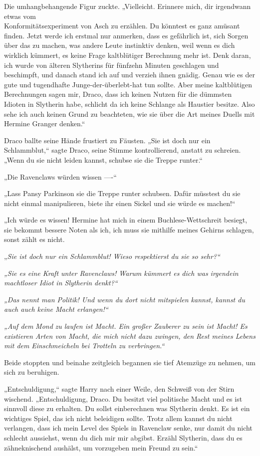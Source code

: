 {Die umhangbehangende Figur zuckte. „Vielleicht. Erinnere mich, dir irgendwann etwas vom\\ Konformitätsexperiment von Asch zu erzählen. Du könntest es ganz amüsant finden. Jetzt werde ich erstmal nur anmerken, dass es gefährlich ist, sich Sorgen über das zu machen, was andere Leute instinktiv denken, weil wenn es dich wirklich kümmert, es keine Frage kaltblütiger Berechnung mehr ist. Denk daran, ich wurde von älteren Slytherins für fünfzehn Minuten geschlagen und beschimpft, und danach stand ich auf und verzieh ihnen gnädig. Genau wie es der gute und tugendhafte Junge-der-überlebt-hat tun sollte. Aber meine kaltblütigen Berechnungen sagen mir, Draco, dass ich keinen Nutzen für die dümmsten Idioten in Slytherin habe, schlicht da ich keine Schlange als Haustier besitze. Also sehe ich auch keinen Grund zu beachteten, wie sie über die Art meines Duells mit Hermine Granger denken.“

Draco ballte seine Hände frustiert zu Fäusten. „Sie ist doch nur ein Schlammblut,“ sagte Draco, seine Stimme kontrollierend, anstatt zu schreien. „Wenn du sie nicht leiden kannst, schubse sie die Treppe runter.“

„Die Ravenclaws würden wissen ----“

„Lass Pansy Parkinson sie die Treppe runter schubsen. Dafür müsstest du sie nicht einmal manipulieren, biete ihr einen Sickel und sie würde es machen!“

„Ich würde es wissen! Hermine hat mich in einem Buchlese-Wettschreit besiegt, sie bekommt bessere Noten als ich, ich muss sie mithilfe meines Gehirns schlagen, sonst zählt es nicht.

„\emph{Sie ist doch nur ein Schlammblut! Wieso respektierst du sie so sehr?“}

\emph{„Sie es eine Kraft unter Ravenclaws! Warum kümmert es dich was irgendein machtloser Idiot in Slytherin denkt?“}

\emph{„Das nennt man Politik! Und wenn du dort nicht mitspielen kannst, kannst du auch auch keine Macht erlangen!“}

\emph{„Auf dem} \emph{Mond} \emph{zu laufen ist Macht. Ein großer Zauberer zu sein ist Macht! Es existieren Arten von Macht, die mich nicht dazu zwingen, den Rest meines Lebens mit dem} \emph{Einschmeicheln bei Trotteln zu verbringen.“}

Beide stoppten und beinahe zeitgleich begannen sie tief Atemzüge zu nehmen, um sich zu beruhigen.

„Entschuldigung,“ sagte Harry nach einer Weile, den Schweiß von der Stirn wischend. „Entschuldigung, Draco. Du besitzt viel politische Macht und es ist sinnvoll diese zu erhalten. Du sollst einberechnen was Slytherin denkt. Es ist ein wichtiges Spiel, das ich nicht beleidigen sollte. Trotz allem kannst du nicht verlangen, dass ich mein Level des Spiels in Ravenclaw senke, nur damit du nicht schlecht aussiehst, wenn du dich mir mir abgibst. Erzähl Slytherin, dass du es zähneknischend aushälst, um vorzugeben mein Freund zu sein.“

}

